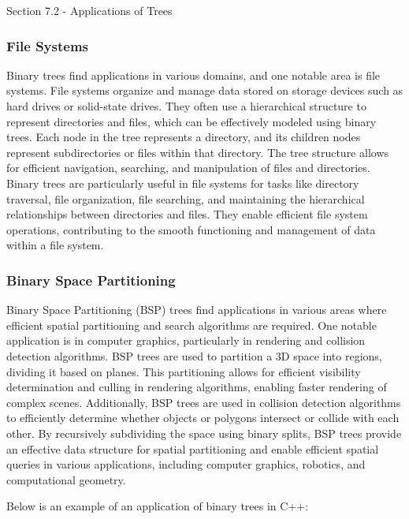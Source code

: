 \begin{notes}{Section 7.2 - Applications of Trees}
    \subsubsection*{File Systems}

    Binary trees find applications in various domains, and one notable area is file systems. File systems organize and manage data stored on storage devices such as hard drives or solid-state drives. They often use a hierarchical structure to represent directories and files, which can be effectively modeled using binary trees. 
    Each node in the tree represents a directory, and its children nodes represent subdirectories or files within that directory. The tree structure allows for efficient navigation, searching, and manipulation of files and directories. Binary trees are particularly useful in file systems for tasks like directory traversal, file 
    organization, file searching, and maintaining the hierarchical relationships between directories and files. They enable efficient file system operations, contributing to the smooth functioning and management of data within a file system.
    
    \subsubsection*{Binary Space Partitioning}
    
    Binary Space Partitioning (BSP) trees find applications in various areas where efficient spatial partitioning and search algorithms are required. One notable application is in computer graphics, particularly in rendering and collision detection algorithms. BSP trees are used to partition a 3D space into regions, 
    dividing it based on planes. This partitioning allows for efficient visibility determination and culling in rendering algorithms, enabling faster rendering of complex scenes. Additionally, BSP trees are used in collision detection algorithms to efficiently determine whether objects or polygons intersect or collide 
    with each other. By recursively subdividing the space using binary splits, BSP trees provide an effective data structure for spatial partitioning and enable efficient spatial queries in various applications, including computer graphics, robotics, and computational geometry.
    
    \begin{highlight}
        Below is an example of an application of binary trees in C++:
    

\end{highlight}
\end{notes}
